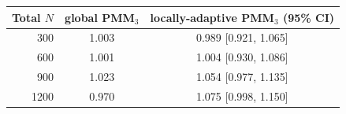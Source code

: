 \begin{tabular}{rcc}
\toprule
Total $N$ & global PMM$_3$ & locally-adaptive PMM$_3$ (95\% CI) \\
\midrule
300 & 1.003 & 0.989 [0.921, 1.065] \\
600 & 1.001 & 1.004 [0.930, 1.086] \\
900 & 1.023 & 1.054 [0.977, 1.135] \\
1200 & 0.970 & 1.075 [0.998, 1.150] \\
\bottomrule
\end{tabular}
